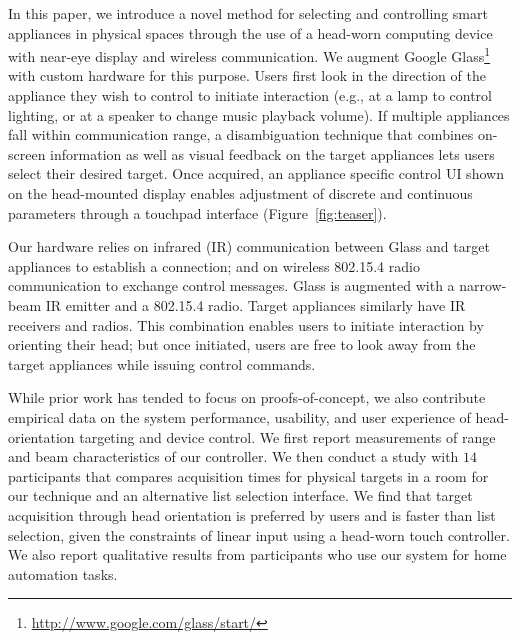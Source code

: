 In this paper, we introduce a novel method for selecting and controlling smart appliances in physical spaces through the use of a head-worn computing device with near-eye display and wireless communication. We augment Google Glass\footnote{\url{http://www.google.com/glass/start/}} with custom hardware for this purpose. Users first look in the direction of the appliance they wish to control to initiate interaction (e.g., at a lamp to control lighting, or at a speaker to change music playback volume).  If multiple appliances fall within communication range, a disambiguation technique that combines on-screen information as well as visual feedback on the target appliances lets users select their desired target. Once acquired, an appliance specific control UI shown on the head-mounted display enables adjustment of discrete and continuous parameters through a touchpad interface (Figure~\ref{fig:teaser}).

Our hardware relies on infrared (IR) communication between Glass and target appliances to establish a connection; and on wireless 802.15.4 radio communication to exchange control messages.  Glass is augmented with a narrow-beam IR emitter and a 802.15.4 radio. Target appliances similarly have IR receivers and radios. This combination enables users to initiate interaction by orienting their head; but once initiated, users are free to look away from the target appliances while issuing control commands.

While prior work has tended to focus on proofs-of-concept, we also contribute empirical data on the system performance, usability, and user experience of head-orientation targeting and device control. We first report measurements of range and beam characteristics of our controller. We then conduct a study with $14$ participants that compares acquisition times for physical targets in a room for our technique and an alternative list selection interface. We find that target acquisition through head orientation is preferred by users and is faster than list selection, given the constraints of linear input using a head-worn touch controller. We also report qualitative results from participants who use our system for home automation tasks.






